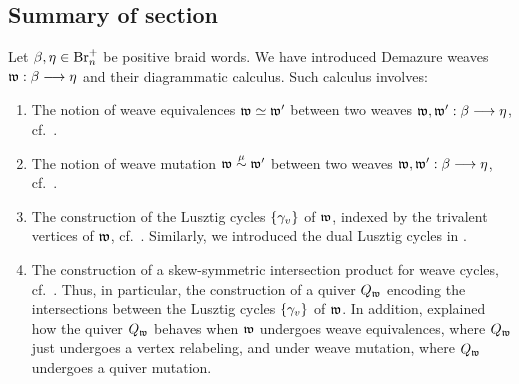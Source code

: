 
\subsection{Summary of section}\label{ssec:summary_Demazure_weaves} Let $\beta,\eta\in\text{Br}_n^+$ be positive braid words. We have introduced Demazure weaves $\mathfrak{w}:\beta\longrightarrow\eta$ and their diagrammatic calculus. Such calculus involves:

\begin{enumerate}
    \item The notion of weave equivalences $\mathfrak{w}\simeq\mathfrak{w}'$ between two weaves $\mathfrak{w},\mathfrak{w}':\beta\longrightarrow\eta$, cf.~.\\
    \item The notion of weave mutation $\mathfrak{w}\stackrel{\mu}{\sim}\mathfrak{w}'$ between two weaves $\mathfrak{w},\mathfrak{w}':\beta\longrightarrow\eta$, cf.~.\\
    \item The construction of the Lusztig cycles $\{\gamma_v\}$ of $\mathfrak{w}$, indexed by the trivalent vertices of $\mathfrak{w}$, cf.~. Similarly, we introduced the dual Lusztig cycles in .\\
    \item The construction of a skew-symmetric intersection product for weave cycles, cf.~. Thus, in particular, the construction of a quiver $Q_{\mathfrak{w}}$ encoding the intersections between the Lusztig cycles $\{\gamma_v\}$ of $\mathfrak{w}$. In addition,  explained how the quiver $Q_{\mathfrak{w}}$ behaves when $\mathfrak{w}$ undergoes weave equivalences,  where $Q_{\mathfrak{w}}$ just undergoes a vertex relabeling, and under weave mutation, where $Q_{\mathfrak{w}}$ undergoes a quiver mutation.
\end{enumerate}
